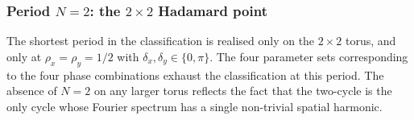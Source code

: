 \subsubsection{Period $N = 2$: the $2 \times 2$ Hadamard point}

The shortest period in the classification is realised only on the
$2 \times 2$ torus, and only at $\rho_x = \rho_y = 1/2$ with
$\delta_x, \delta_y \in \{0, \pi\}$. The four parameter sets
corresponding to the four phase combinations exhaust the classification
at this period. The absence of $N = 2$ on any larger torus reflects the
fact that the two-cycle is the only cycle whose Fourier spectrum has a
single non-trivial spatial harmonic.
